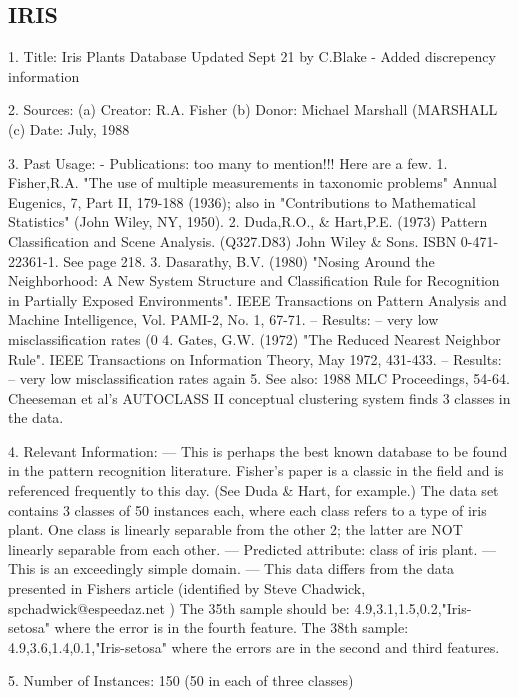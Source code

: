 \documentclass[letterpaper,12pt,titlepage,oneside,final]{book}
\begin{document}
	\subsection{IRIS}
	
	1. Title: Iris Plants Database
	Updated Sept 21 by C.Blake - Added discrepency information
	
	2. Sources:
	(a) Creator: R.A. Fisher
	(b) Donor: Michael Marshall (MARSHALL%
	(c) Date: July, 1988
	
	3. Past Usage:
	- Publications: too many to mention!!!  Here are a few.
	1. Fisher,R.A. "The use of multiple measurements in taxonomic problems"
	Annual Eugenics, 7, Part II, 179-188 (1936); also in "Contributions
	to Mathematical Statistics" (John Wiley, NY, 1950).
	2. Duda,R.O., \& Hart,P.E. (1973) Pattern Classification and Scene Analysis.
	(Q327.D83) John Wiley \& Sons.  ISBN 0-471-22361-1.  See page 218.
	3. Dasarathy, B.V. (1980) "Nosing Around the Neighborhood: A New System
	Structure and Classification Rule for Recognition in Partially Exposed
	Environments".  IEEE Transactions on Pattern Analysis and Machine
	Intelligence, Vol. PAMI-2, No. 1, 67-71.
	-- Results:
	-- very low misclassification rates (0%
	4. Gates, G.W. (1972) "The Reduced Nearest Neighbor Rule".  IEEE 
	Transactions on Information Theory, May 1972, 431-433.
	-- Results:
	-- very low misclassification rates again
	5. See also: 1988 MLC Proceedings, 54-64.  Cheeseman et al's AUTOCLASS II
	conceptual clustering system finds 3 classes in the data.
	
	4. Relevant Information:
	--- This is perhaps the best known database to be found in the pattern
	recognition literature.  Fisher's paper is a classic in the field
	and is referenced frequently to this day.  (See Duda \& Hart, for
	example.)  The data set contains 3 classes of 50 instances each,
	where each class refers to a type of iris plant.  One class is
	linearly separable from the other 2; the latter are NOT linearly
	separable from each other.
	--- Predicted attribute: class of iris plant.
	--- This is an exceedingly simple domain.
	--- This data differs from the data presented in Fishers article
	(identified by Steve Chadwick,  spchadwick@espeedaz.net )
	The 35th sample should be: 4.9,3.1,1.5,0.2,"Iris-setosa"
	where the error is in the fourth feature.
	The 38th sample: 4.9,3.6,1.4,0.1,"Iris-setosa"
	where the errors are in the second and third features.  
	
	5. Number of Instances: 150 (50 in each of three classes)
	
\end{document}
